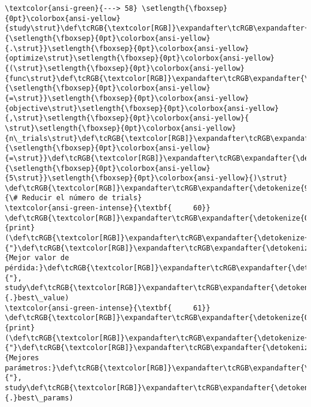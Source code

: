 \documentclass[11pt]{article}
\begin{document}
\begin{Verbatim}[commandchars=\\\{\}, frame=single, framerule=2mm, rulecolor=\color{outerrorbackground}]
\textcolor{ansi-green}{---> 58} \setlength{\fboxsep}{0pt}\colorbox{ansi-yellow}{study\strut}\def\tcRGB{\textcolor[RGB]}\expandafter\tcRGB\expandafter{\detokenize{98,98,98}}{\setlength{\fboxsep}{0pt}\colorbox{ansi-yellow}{.\strut}}\setlength{\fboxsep}{0pt}\colorbox{ansi-yellow}{optimize\strut}\setlength{\fboxsep}{0pt}\colorbox{ansi-yellow}{(\strut}\setlength{\fboxsep}{0pt}\colorbox{ansi-yellow}{func\strut}\def\tcRGB{\textcolor[RGB]}\expandafter\tcRGB\expandafter{\detokenize{98,98,98}}{\setlength{\fboxsep}{0pt}\colorbox{ansi-yellow}{=\strut}}\setlength{\fboxsep}{0pt}\colorbox{ansi-yellow}{objective\strut}\setlength{\fboxsep}{0pt}\colorbox{ansi-yellow}{,\strut}\setlength{\fboxsep}{0pt}\colorbox{ansi-yellow}{ \strut}\setlength{\fboxsep}{0pt}\colorbox{ansi-yellow}{n\_trials\strut}\def\tcRGB{\textcolor[RGB]}\expandafter\tcRGB\expandafter{\detokenize{98,98,98}}{\setlength{\fboxsep}{0pt}\colorbox{ansi-yellow}{=\strut}}\def\tcRGB{\textcolor[RGB]}\expandafter\tcRGB\expandafter{\detokenize{98,98,98}}{\setlength{\fboxsep}{0pt}\colorbox{ansi-yellow}{5\strut}}\setlength{\fboxsep}{0pt}\colorbox{ansi-yellow}{)\strut}  \def\tcRGB{\textcolor[RGB]}\expandafter\tcRGB\expandafter{\detokenize{95,135,135}}{\# Reducir el número de trials}
\textcolor{ansi-green-intense}{\textbf{     60}} \def\tcRGB{\textcolor[RGB]}\expandafter\tcRGB\expandafter{\detokenize{0,135,0}}{print}(\def\tcRGB{\textcolor[RGB]}\expandafter\tcRGB\expandafter{\detokenize{175,0,0}}{"}\def\tcRGB{\textcolor[RGB]}\expandafter\tcRGB\expandafter{\detokenize{175,0,0}}{Mejor valor de pérdida:}\def\tcRGB{\textcolor[RGB]}\expandafter\tcRGB\expandafter{\detokenize{175,0,0}}{"}, study\def\tcRGB{\textcolor[RGB]}\expandafter\tcRGB\expandafter{\detokenize{98,98,98}}{.}best\_value)
\textcolor{ansi-green-intense}{\textbf{     61}} \def\tcRGB{\textcolor[RGB]}\expandafter\tcRGB\expandafter{\detokenize{0,135,0}}{print}(\def\tcRGB{\textcolor[RGB]}\expandafter\tcRGB\expandafter{\detokenize{175,0,0}}{"}\def\tcRGB{\textcolor[RGB]}\expandafter\tcRGB\expandafter{\detokenize{175,0,0}}{Mejores parámetros:}\def\tcRGB{\textcolor[RGB]}\expandafter\tcRGB\expandafter{\detokenize{175,0,0}}{"}, study\def\tcRGB{\textcolor[RGB]}\expandafter\tcRGB\expandafter{\detokenize{98,98,98}}{.}best\_params)


\end{Verbatim}
\end{document}
